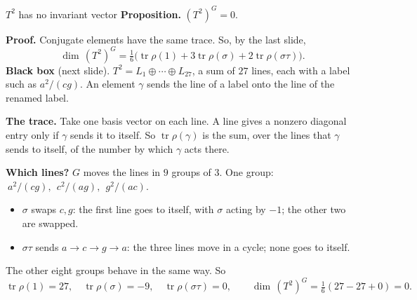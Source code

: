 \begin{frame}{\(T^2\) has no invariant vector}
\small
\textbf{Proposition.} \((T^2)^G=0\).
\par
\textbf{Proof.} Conjugate elements have the same trace. So, by the last slide,
\[
\dim\,(T^2)^G=\tfrac16\bigl(\operatorname{tr}\rho(1)+3\operatorname{tr}\rho(\sigma)+2\operatorname{tr}\rho(\sigma\tau)\bigr).
\]
\textbf{Black box} (next slide). \(T^2=L_1\oplus\cdots\oplus L_{27}\), a sum of \(27\) lines, each with a label such as \(a^2/(cg)\). An element \(\gamma\) sends the line of a label onto the line of the renamed label.
\par
\textbf{The trace.} Take one basis vector on each line. A line gives a nonzero diagonal entry only if \(\gamma\) sends it to itself. So \(\operatorname{tr}\rho(\gamma)\) is the sum, over the lines that \(\gamma\) sends to itself, of the number by which \(\gamma\) acts there.
\par
\textbf{Which lines?} \(G\) moves the lines in \(9\) groups of \(3\). One group: \(\ a^2/(cg),\ \ c^2/(ag),\ \ g^2/(ac)\).
\begin{itemize}
\setlength{\itemsep}{0pt}
\item \(\sigma\) swaps \(c,g\): the first line goes to itself, with \(\sigma\) acting by \(-1\); the other two are swapped.
\item \(\sigma\tau\) sends \(a\to c\to g\to a\): the three lines move in a cycle; none goes to itself.
\end{itemize}
The other eight groups behave in the same way. So
\[
\operatorname{tr}\rho(1)=27,\quad\operatorname{tr}\rho(\sigma)=-9,\quad\operatorname{tr}\rho(\sigma\tau)=0,\qquad\boxed{\dim\,(T^2)^G=\tfrac16(27-27+0)=0.}
\]
\src{\textcolor{red}{The nine groups and the action by \(-1\): not re-checked.}}
\end{frame}

